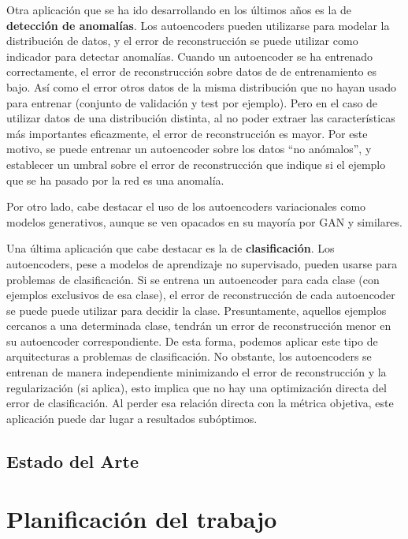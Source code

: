 \documentclass[
  12pt,
  a4paperpaper,
]{report}
\begin{document}
Otra aplicación que se ha ido desarrollando en los últimos años es la de
\textbf{detección de anomalías}. Los autoencoders pueden utilizarse para
modelar la distribución de datos, y el error de reconstrucción se puede
utilizar como indicador para detectar anomalías. Cuando un autoencoder
se ha entrenado correctamente, el error de reconstrucción sobre datos de
de entrenamiento es bajo. Así como el error otros datos de la misma
distribución que no hayan usado para entrenar (conjunto de validación y
test por ejemplo). Pero en el caso de utilizar datos de una distribución
distinta, al no poder extraer las características más importantes
eficazmente, el error de reconstrucción es mayor. Por este motivo, se
puede entrenar un autoencoder sobre los datos ``no anómalos'', y
establecer un umbral sobre el error de reconstrucción que indique si el
ejemplo que se ha pasado por la red es una anomalía.

Por otro lado, cabe destacar el uso de los autoencoders variacionales
como modelos generativos, aunque se ven opacados en su mayoría por GAN y
similares.

Una última aplicación que cabe destacar es la de \textbf{clasificación}.
Los autoencoders, pese a modelos de aprendizaje no supervisado, pueden
usarse para problemas de clasificación. Si se entrena un autoencoder
para cada clase (con ejemplos exclusivos de esa clase), el error de
reconstrucción de cada autoencoder se puede puede utilizar para decidir
la clase. Presuntamente, aquellos ejemplos cercanos a una determinada
clase, tendrán un error de reconstrucción menor en su autoencoder
correspondiente. De esta forma, podemos aplicar este tipo de
arquitecturas a problemas de clasificación. No obstante, los
autoencoders se entrenan de manera independiente minimizando el error de
reconstrucción y la regularización (si aplica), esto implica que no hay
una optimización directa del error de clasificación. Al perder esa
relación directa con la métrica objetiva, este aplicación puede dar
lugar a resultados subóptimos.

\hypertarget{estado-del-arte}{%
\section{Estado del Arte}\label{estado-del-arte}}

\hypertarget{planificaciuxf3n-del-trabajo}{%
\chapter{Planificación del trabajo}\label{planificaciuxf3n-del-trabajo}}
\end{document}
